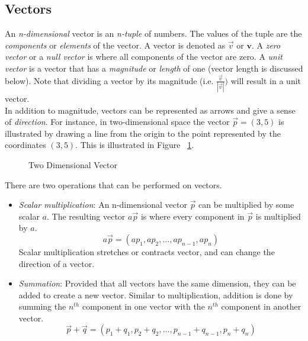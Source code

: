 \documentclass[12pt]{article}
\begin{document}
\subsection{Vectors}

An \emph{n-dimensional} vector is an \emph{n-tuple} of numbers. The values of the tuple are the \emph{components} or \emph{elements} of the vector. A vector is denoted as $\vec{v}$ or $\mathbf{v}$. A \emph{zero vector} or a \emph{null vector} is where all components of the vector are zero. A \emph{unit vector} is a vector that has a \emph{magnitude} or \emph{length} of one (vector length is discussed below). Note that dividing a vector by its magnitude (i.e. $\frac{\vec{v}}{|\vec{v}|})$ will result in a unit vector. \\

In addition to magnitude, vectors can be represented as arrows and give a sense of \emph{direction}. For instance, in two-dimensional space the vector $\vec{p}=(3,5)$ is illustrated by drawing a line from the origin to the point represented by the coordinates $(3,5)$. This is illustrated in Figure ~\ref{fig:vector}.\\

\begin{figure}[h!]
\centering
\caption{Two Dimensional Vector}
\label{fig:vector}
\end{figure}

 There are two operations that can be performed on vectors. 
\begin{itemize}
\item \emph{Scalar multiplication}: An n-dimensional vector $\vec{p}$ can be multiplied by some scalar $a$. The resulting vector $a\vec{p}$ is where every component in $\vec{p}$ is multiplied by $a$.
\[
a\vec{p} = (ap_1, ap_2, \ldots, ap_{n-1}, ap_n)
\]
Scalar multiplication stretches or contracts vector, and can change the direction of a vector.
\item \emph{Summation}: Provided that all vectors have the same dimension, they can be added to create a new vector. Similar to multiplication, addition is done by summing the $n^{th}$ component in one vector with the $n^{th}$ component in another vector. 
\[
\vec{p}+\vec{q} = (p_1 + q_1, p_2 + q_2, \ldots, p_{n-1} + q_{n-1}, p_n + q_n)
\]
\end{itemize}
\end{document}

